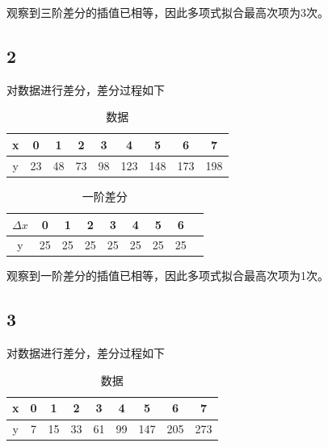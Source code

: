 \documentclass{article}
\begin{document}
观察到三阶差分的插值已相等，因此多项式拟合最高次项为3次。



\subsection{2}

对数据进行差分，差分过程如下

\begin{table}[!h]
\begin{center}
\begin{tabular}{c|c c c c c c c c}
    x & 0 & 1 & 2 & 3 & 4 & 5 & 6 & 7  \\
    \hline
    y & 23 & 48 & 73 & 98 & 123 & 148 & 173 & 198 \\
\end{tabular}
\caption{\label{demo-table}数据}
\end{center}
\end{table}

\begin{table}[!h]
\begin{center}
\begin{tabular}{c|c c c c c c c c}
    $\Delta x$ & 0 & 1 & 2 & 3 & 4 & 5 & 6  \\
    \hline
    y & 25 & 25 & 25 & 25 & 25 & 25 & 25 \\
\end{tabular}
\caption{\label{demo-table}一阶差分}
\end{center}
\end{table}

观察到一阶差分的插值已相等，因此多项式拟合最高次项为1次。


\subsection{3}

对数据进行差分，差分过程如下

\begin{table}[!h]
\begin{center}
\begin{tabular}{c|c c c c c c c c}
    x & 0 & 1 & 2 & 3 & 4 & 5 & 6 & 7  \\
    \hline
    y & 7 & 15 & 33 & 61 & 99 & 147 & 205 & 273 \\
\end{tabular}
\caption{\label{demo-table}数据}
\end{center}
\end{table}
\end{document}
